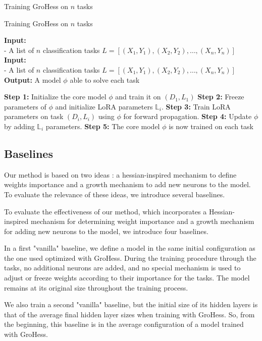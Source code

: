 \documentclass[twocolumn]{article}
\begin{document}
\begin{algorithm}
    \caption{Training GroHess on $n$ tasks}
    \caption{Training GroHess on $n$ tasks}
    \begin{algorithmic}[1]
    \State \textbf{Input:} \\ 
    - A list of $n$ classification tasks $L = [(X_1,Y_1), (X_2,Y_2), \ldots, (X_n,Y_n)]$
    \State \textbf{Input:} \\ 
    - A list of $n$ classification tasks $L = [(X_1,Y_1), (X_2,Y_2), \ldots, (X_n,Y_n)]$
    \State \textbf{Output:} A model $\phi$ able to solve each task
    \State
    
    \State \textbf{Step 1:} Initialize the core model $\phi$ and train it on $(D_1,L_1)$
        \State \textbf{Step 2:} Freeze parameters of $\phi$ and initialize LoRA parameters $\mathbb{L}_i$.
        \State \textbf{Step 3:} Train LoRA parameters on task $(D_i,L_i)$ using $\phi$ for forward propagation.
        \State \textbf{Step 4:} Update $\phi$ by adding $\mathbb{L}_i$ parameters.
    \EndFor
    \State \textbf{Step 5:} The core model $\phi$ is now trained on each task
    \end{algorithmic}
    \end{algorithm}


\subsection{Baselines}


Our method is based on two ideas : a hessian-inspired mechanism to define weights importance and a growth mechanism to add new neurons to the model. To evaluate the relevance of these ideas, we introduce several baselines.

To evaluate the effectiveness of our method, which incorporates a Hessian-inspired mechanism for determining weight importance and a growth mechanism for adding new neurons to the model, we introduce four baselines.

\vspace{2mm}
\noindent
In a first "vanilla" baseline, we define a model in the same initial configuration as the one used optimized with GroHess. During the training procedure through the tasks, no additional neurons are added, and no special mechanism is used to adjust or freeze weights according to their importance for the tasks. The model remains at its original size throughout the training process.

\vspace{2mm}
\noindent
We also train a second "vanilla" baseline, but the initial size of its hidden layers is that of the average final hidden layer sizes when training with GroHess. So, from the beginning, this baseline is in the average configuration of a model trained with GroHess. 
\end{document}
